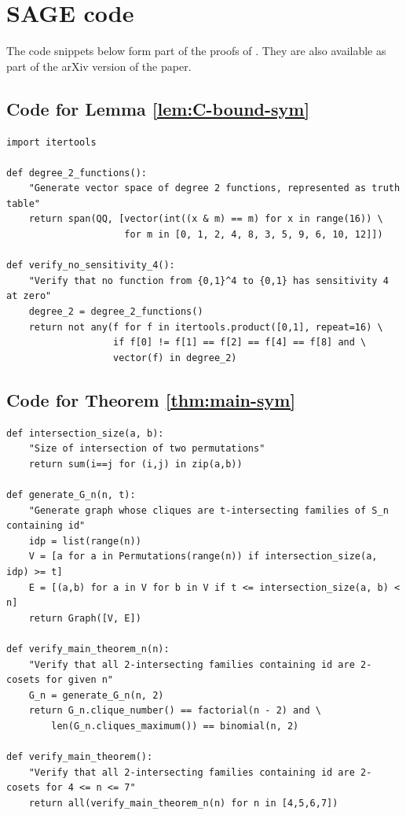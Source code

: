 \documentclass{article}
\theoremstyle{definition}
\begin{document}



\appendix

\section{SAGE code} \label{apx:SAGE}

The code snippets below form part of the proofs of . They are also available as part of the arXiv version of the paper.

\subsection{Code for Lemma \ref{lem:C-bound-sym}} \label{apx:C-bound-sym}

\begin{lstlisting}
import itertools

def degree_2_functions():
    "Generate vector space of degree 2 functions, represented as truth table"
    return span(QQ, [vector(int((x & m) == m) for x in range(16)) \
                     for m in [0, 1, 2, 4, 8, 3, 5, 9, 6, 10, 12]])

def verify_no_sensitivity_4():
    "Verify that no function from {0,1}^4 to {0,1} has sensitivity 4 at zero"
    degree_2 = degree_2_functions()
    return not any(f for f in itertools.product([0,1], repeat=16) \
                   if f[0] != f[1] == f[2] == f[4] == f[8] and \
                   vector(f) in degree_2)
\end{lstlisting}

\subsection{Code for Theorem \ref{thm:main-sym}} \label{apx:main-sym}

\begin{lstlisting}
def intersection_size(a, b):
    "Size of intersection of two permutations"
    return sum(i==j for (i,j) in zip(a,b))

def generate_G_n(n, t):
    "Generate graph whose cliques are t-intersecting families of S_n containing id"
    idp = list(range(n))
    V = [a for a in Permutations(range(n)) if intersection_size(a, idp) >= t]
    E = [(a,b) for a in V for b in V if t <= intersection_size(a, b) < n]
    return Graph([V, E])

def verify_main_theorem_n(n):
    "Verify that all 2-intersecting families containing id are 2-cosets for given n"
    G_n = generate_G_n(n, 2)
    return G_n.clique_number() == factorial(n - 2) and \
        len(G_n.cliques_maximum()) == binomial(n, 2)

def verify_main_theorem():
    "Verify that all 2-intersecting families containing id are 2-cosets for 4 <= n <= 7"
    return all(verify_main_theorem_n(n) for n in [4,5,6,7])
\end{lstlisting}
\end{document}
